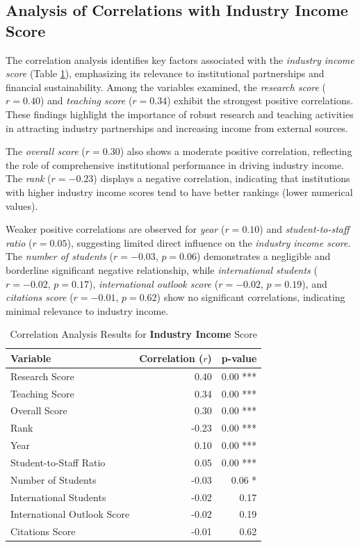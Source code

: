 \documentclass[conference]{IEEEtran}
\begin{document}
\subsection{Analysis of Correlations with Industry Income Score}

The correlation analysis identifies key factors associated with the \textit{industry income score} (Table \ref{tab:correlation_industry_income}), emphasizing its relevance to institutional partnerships and financial sustainability. Among the variables examined, the \textit{research score} ($r = 0.40$) and \textit{teaching score} ($r = 0.34$) exhibit the strongest positive correlations. These findings highlight the importance of robust research and teaching activities in attracting industry partnerships and increasing income from external sources.

The \textit{overall score} ($r = 0.30$) also shows a moderate positive correlation, reflecting the role of comprehensive institutional performance in driving industry income. The \textit{rank} ($r = -0.23$) displays a negative correlation, indicating that institutions with higher industry income scores tend to have better rankings (lower numerical values).

Weaker positive correlations are observed for \textit{year} ($r = 0.10$) and \textit{student-to-staff ratio} ($r = 0.05$), suggesting limited direct influence on the \textit{industry income score}. The \textit{number of students} ($r = -0.03$, $p = 0.06$) demonstrates a negligible and borderline significant negative relationship, while \textit{international students} ($r = -0.02$, $p = 0.17$), \textit{international outlook score} ($r = -0.02$, $p = 0.19$), and \textit{citations score} ($r = -0.01$, $p = 0.62$) show no significant correlations, indicating minimal relevance to industry income.

\begin{table}[h!]
	\centering
	\caption{Correlation Analysis Results for \textbf{Industry Income} Score}
	\label{tab:correlation_industry_income}
	\begin{tabular}{|l|r|r|}
		\hline
		\textbf{Variable} & \textbf{Correlation ($r$)} & \textbf{p-value} \\
		\hline
		Research Score & 0.40 & 0.00 *** \\
		Teaching Score & 0.34 & 0.00 *** \\
		Overall Score & 0.30 & 0.00 *** \\
		Rank & -0.23 & 0.00 *** \\
		Year & 0.10 & 0.00 *** \\
		Student-to-Staff Ratio & 0.05 & 0.00 *** \\
		Number of Students & -0.03 & 0.06 * \\
		International Students & -0.02 & 0.17 \\
		International Outlook Score & -0.02 & 0.19 \\
		Citations Score & -0.01 & 0.62 \\
		\hline
	\end{tabular}
\end{table}
\end{document}

